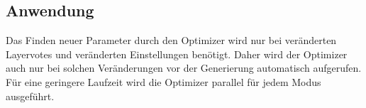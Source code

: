 \subsection{Anwendung}
Das Finden neuer Parameter durch den Optimizer wird nur bei veränderten Layervotes und veränderten Einstellungen benötigt.
Daher wird der Optimizer auch nur bei solchen Veränderungen vor der Generierung automatisch aufgerufen.
Für eine geringere Laufzeit wird die Optimizer parallel für jedem Modus ausgeführt.